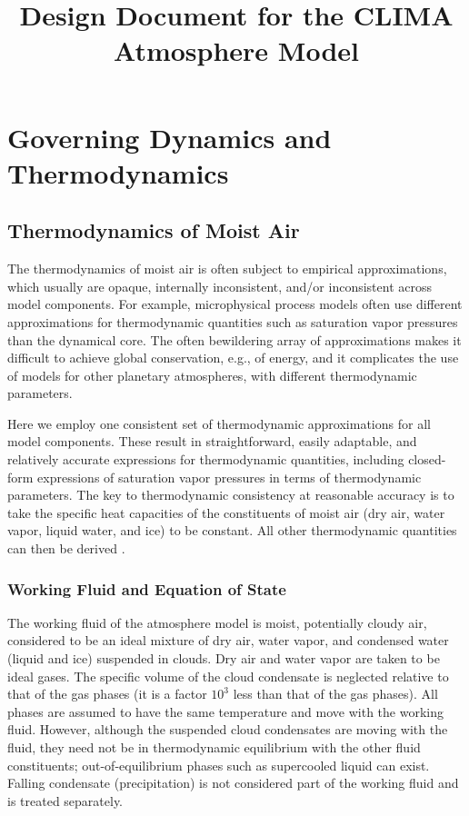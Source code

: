 \documentclass{report}
\title{Design Document for the CLIMA Atmosphere Model}
\author{ }
\begin{document}
\maketitle
\tableofcontents

\chapter{Governing Dynamics and Thermodynamics}

\section{Thermodynamics of Moist Air}\label{s:thermodynamics}

The thermodynamics of moist air is often subject to empirical approximations, which usually are opaque, internally inconsistent, and/or inconsistent across model components. For example, microphysical process models often use different approximations for thermodynamic quantities such as saturation vapor pressures than the dynamical core. The often bewildering array of approximations makes it difficult to achieve global conservation, e.g., of energy, and it complicates the use of models for other planetary atmospheres, with different thermodynamic parameters. 

Here we employ one consistent set of thermodynamic approximations for all model components. These result in straightforward, easily adaptable, and relatively accurate expressions for thermodynamic quantities, including closed-form expressions of saturation vapor pressures in terms of thermodynamic parameters. The key to thermodynamic consistency at reasonable accuracy is to take the specific heat capacities of the constituents of moist air (dry air, water vapor, liquid water, and ice) to be constant. All other thermodynamic quantities can then be derived \citep[cf.][]{Romps08a,Marquet16a}. 

\subsection{Working Fluid and Equation of State}

The working fluid of the atmosphere model is moist, potentially cloudy air, considered to be an ideal mixture of dry air, water vapor, and condensed water (liquid and ice) suspended in clouds. Dry air and water vapor are taken to be ideal gases. The specific volume of the cloud condensate is neglected relative to that of the gas phases (it is a  factor $10^{3}$ less than that of the gas phases). All phases are assumed to have the same temperature and move with the working fluid. However, although the suspended cloud condensates are moving with the fluid, they need not be in thermodynamic equilibrium with the other fluid constituents; out-of-equilibrium phases such as supercooled liquid can exist. Falling condensate (precipitation) is not considered part of the working fluid and is treated separately.
\end{document}
